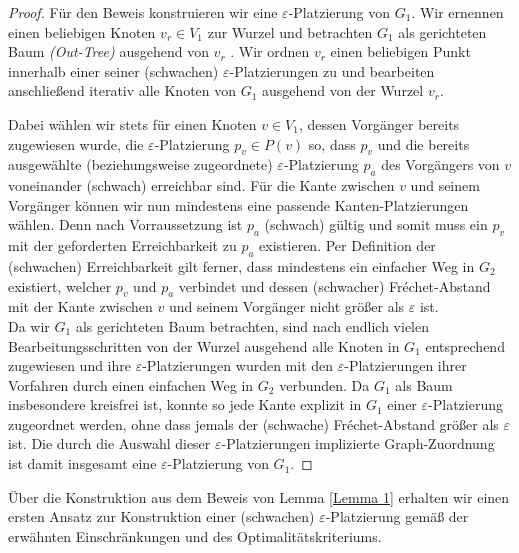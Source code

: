 \documentclass[a4paper, 12pt, twoside]{article}
\theoremstyle{Format1} %
\begin{document}
\begin{proof}
Für den Beweis konstruieren wir eine $\varepsilon$-Platzierung von $G_1$.
Wir ernennen einen beliebigen Knoten $v_r \in V_1$ zur Wurzel und betrachten $G_1$ als gerichteten Baum \textit{(Out-Tree)} ausgehend von $v_r$ .
Wir ordnen $v_r$ einen beliebigen Punkt innerhalb einer seiner (schwachen) $\varepsilon$-Platzierungen zu und bearbeiten anschließend iterativ alle
Knoten von $G_1$ ausgehend von der Wurzel $v_r$.

Dabei wählen wir stets für einen Knoten $v \in V_1$, dessen Vorgänger bereits zugewiesen wurde,
die $\varepsilon$-Platzierung $p_v \in P(v)$ so, dass $p_v$
und die bereits ausgewählte (beziehungsweise zugeordnete) $\varepsilon$-Platzierung $p_a$ des Vorgängers von $v$ voneinander (schwach) erreichbar sind.
Für die Kante zwischen $v$ und seinem Vorgänger können wir nun mindestens eine passende Kanten-Platzierungen wählen.
Denn nach Vorraussetzung ist $p_a$ (schwach) gültig und somit muss ein $p_v$ mit der geforderten Erreichbarkeit zu $p_a$ existieren.
Per Definition der (schwachen) Erreichbarkeit gilt ferner, dass mindestens ein einfacher Weg in $G_2$ existiert, welcher $p_v$ und $p_a$ verbindet
und dessen (schwacher) Fréchet-Abstand mit der Kante zwischen $v$ und seinem Vorgänger nicht größer als $\varepsilon$ ist.
\\
Da wir $G_1$ als gerichteten Baum betrachten, sind nach endlich vielen Bearbeitungsschritten von der Wurzel ausgehend alle Knoten in $G_1$
entsprechend zugewiesen und ihre $\varepsilon$-Platzierungen
wurden mit den $\varepsilon$-Platzierungen ihrer Vorfahren durch einen einfachen Weg in $G_2$ verbunden.
Da $G_1$ als Baum insbesondere kreisfrei ist, konnte so jede Kante explizit in $G_1$ einer $\varepsilon$-Platzierung zugeordnet werden, ohne dass jemals der
(schwache) Fréchet-Abstand größer als $\varepsilon$ ist.
Die durch die Auswahl dieser $\varepsilon$-Platzierungen implizierte Graph-Zuordnung ist damit insgesamt eine $\varepsilon$-Platzierung von $G_1$.
\end{proof}

Über die Konstruktion aus dem Beweis von Lemma \ref{Lemma 1} erhalten wir einen ersten Ansatz zur Konstruktion einer (schwachen) $\varepsilon$-Platzierung
gemäß der erwähnten Einschränkungen und des Optimalitätskriteriums.
\end{document}
